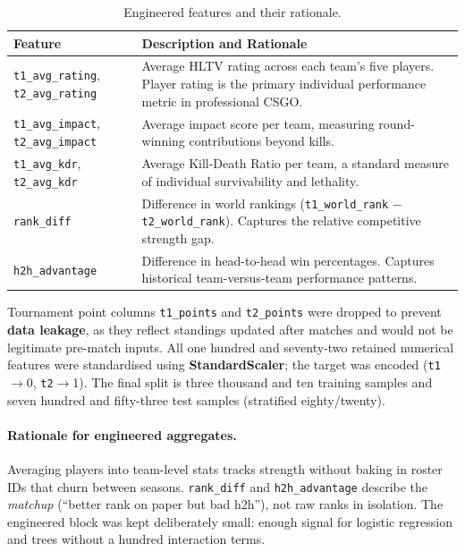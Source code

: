 \documentclass[12pt,a4paper]{article}
\begin{document}
\begin{table}[H]
\centering
\caption{Engineered features and their rationale.}
\begin{tabularx}{\textwidth}{lX}
\toprule
\textbf{Feature} & \textbf{Description and Rationale} \\
\midrule
\texttt{t1\_avg\_rating}, \texttt{t2\_avg\_rating} & Average HLTV rating across each team's five players. Player rating is the primary individual performance metric in professional CSGO. \\
\texttt{t1\_avg\_impact}, \texttt{t2\_avg\_impact} & Average impact score per team, measuring round-winning contributions beyond kills. \\
\texttt{t1\_avg\_kdr}, \texttt{t2\_avg\_kdr} & Average Kill-Death Ratio per team, a standard measure of individual survivability and lethality. \\
\texttt{rank\_diff} & Difference in world rankings (\texttt{t1\_world\_rank} $-$ \texttt{t2\_world\_rank}). Captures the relative competitive strength gap. \\
\texttt{h2h\_advantage} & Difference in head-to-head win percentages. Captures historical team-versus-team performance patterns. \\
\bottomrule
\end{tabularx}
\end{table}

Tournament point columns \texttt{t1\_points} and \texttt{t2\_points} were dropped to prevent \textbf{data leakage}, as they reflect standings updated after matches and would not be legitimate pre-match inputs. All one hundred and seventy-two retained numerical features were standardised using \textbf{StandardScaler}; the target was encoded (\texttt{t1}$\rightarrow$0, \texttt{t2}$\rightarrow$1). The final split is three thousand and ten training samples and seven hundred and fifty-three test samples (stratified eighty/twenty).

\paragraph{Rationale for engineered aggregates.}
Averaging players into team-level stats tracks strength without baking in roster IDs that churn between seasons. \texttt{rank\_diff} and \texttt{h2h\_advantage} describe the \textit{matchup} (``better rank on paper but bad h2h''), not raw ranks in isolation. The engineered block was kept deliberately small: enough signal for logistic regression and trees without a hundred interaction terms.
\end{document}
